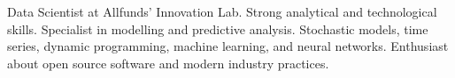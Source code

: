 

\begin{cvparagraph}

Data Scientist at Allfunds' Innovation Lab. Strong analytical and technological
skills. Specialist in modelling and predictive analysis. Stochastic models, time
series, dynamic programming, machine learning, and neural networks. Enthusiast about
open source software and modern industry practices.

\end{cvparagraph}

